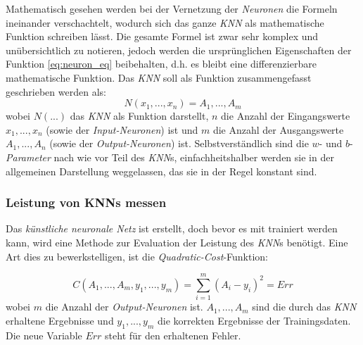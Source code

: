 Mathematisch gesehen werden bei der Vernetzung der \textit{Neuronen} die Formeln ineinander verschachtelt, wodurch sich das ganze \textit{KNN} als mathematische Funktion schreiben lässt. Die gesamte Formel ist zwar sehr komplex und unübersichtlich zu notieren, jedoch werden die ursprünglichen Eigenschaften der Funktion \ref{eq:neuron_eq} beibehalten, d.h. es bleibt eine differenzierbare mathematische Funktion. Das \textit{KNN} soll als Funktion zusammengefasst geschrieben werden als:
\begin{equation}\label{eq:ann}
N(x_1,...,x_n) = A_1,...,A_m
\end{equation}
wobei $N(...)$ das \textit{KNN} als Funktion darstellt, $n$ die Anzahl der Eingangswerte $x_1,...,x_n$ (sowie der \textit{Input-Neuronen}) ist und $m$ die Anzahl der Ausgangswerte $A_1,...,A_n$ (sowie der \textit{Output-Neuronen}) ist. Selbstverständlich sind die $w$- und $b$-\textit{Parameter} nach wie vor Teil des \textit{KNN}s, einfachheitshalber werden sie in der allgemeinen Darstellung weggelassen, das sie in der Regel konstant sind.


\subsubsection{Leistung von KNNs messen}\label{cha:theo:cost}

Das \textit{künstliche neuronale Netz} ist erstellt, doch bevor es mit trainiert werden kann, wird eine Methode zur Evaluation der Leistung des \textit{KNN}s benötigt. Eine Art dies zu bewerkstelligen, ist die \textit{Quadratic-Cost}-Funktion:

\begin{equation}\label{eq:cost}
C(A_1,...,A_m,y_1,...,y_m)=\sum_{i=1}^{m}\left(A_i-y_i\right)^2=Err
\end{equation}
wobei $m$ die Anzahl der \textit{Output-Neuronen} ist. $A_1,...,A_m$ sind die durch das \textit{KNN} erhaltene Ergebnisse und $y_1,...,y_m$ die korrekten Ergebnisse der Trainingsdaten. Die neue Variable $Err$ steht für den erhaltenen Fehler. %

